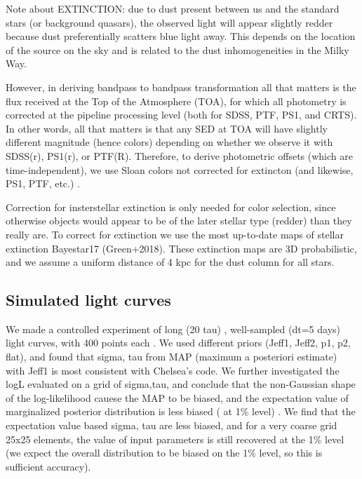 \documentclass[twocolumn]{aastex62}
\begin{document}
Note about EXTINCTION:  due to dust present between us and the standard stars (or background quasars), the observed light will appear slightly redder because dust preferentially scatters blue light away. This depends on the location of the source on the  sky and is related to the dust inhomogeneities in the Milky Way. 

However, in deriving bandpass to bandpass transformation all that matters is the flux received at the Top of the Atmosphere (TOA), for which all photometry is corrected at the pipeline processing level (both for SDSS,  PTF, PS1, and CRTS). In other words, all that matters is that any SED at TOA will have slightly different magnitude (hence colors) depending on whether we observe it with SDSS(r),  PS1(r), or PTF(R).  Therefore, to derive photometric offsets (which are time-independent), we use Sloan colors not corrected for extincton (and likewise, PS1, PTF, etc.) .  

Correction for insterstellar extinction is only needed for color selection, since otherwise objects would appear to be of the later stellar type (redder) than they really are. To correct for extinction we use the most up-to-date maps of stellar extinction Bayestar17 (Green+2018). These extinction maps are 3D probabilistic, and we assume a uniform distance of 4 kpc for the dust column for all stars.  







\subsection{Simulated light curves}
We made a controlled experiment of long (20 tau) , well-sampled (dt=5 days) light curves,  with 400 points each . We used different priors (Jeff1, Jeff2, p1, p2, flat), and found that  sigma, tau from MAP (maximum a posteriori estimate) with Jeff1 is most consistent with Chelsea's code. We further investigated the logL evaluated on  a grid of sigma,tau, and conclude that the non-Gaussian shape of  the log-likelihood cauese the MAP to be biased, and the expectation value of marginalized posterior distribution is less biased  ( at 1\% level) . We find that the expectation value based sigma, tau are less biased, and for a very coarse grid 25x25 elements, the value of input parameters is  still recovered at the 1\% level (we expect the overall distribution to be biased on the 1\% level, so this is sufficient accuracy). 
\end{document}
